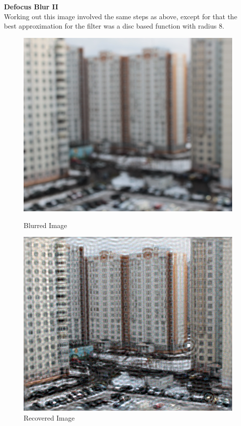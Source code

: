\documentclass{article}
\begin{document}
    \textbf{Defocus Blur II}\\
    Working out this image involved the same steps as above, except for that the best approximation for the filter was a disc based function with radius 8.
    \begin{figure}[!htb]
      \includegraphics[scale=0.33]{./real_world/yuzhikov/yuzhikov.png}
      \caption{Blurred Image}
    \endminipage\hfill
      \includegraphics[scale=0.3]{./real_world/yuzhikov/final.png}
      \caption{Recovered Image}
    \endminipage\hfill
    \end{figure}
    
\end{document}
